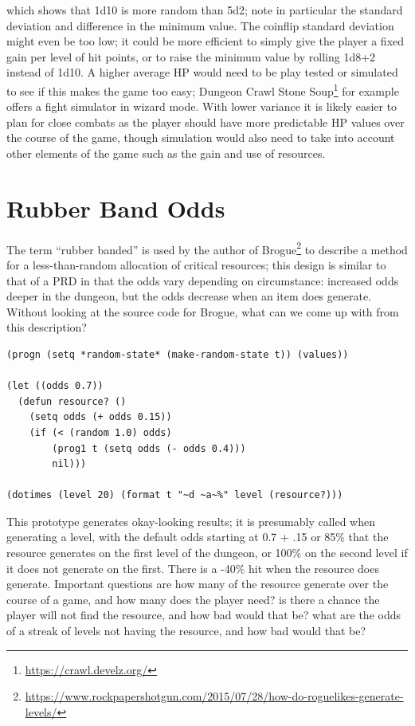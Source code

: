 \documentclass[12pt,a4paper]{article}
\begin{document}
which shows that 1d10 is more random than 5d2; note in particular the
standard deviation and difference in the minimum value. The coinflip
standard deviation might even be too low; it could be more efficient to
simply give the player a fixed gain per level of hit points, or to raise
the minimum value by rolling 1d8+2 instead of 1d10. A higher average HP
would need to be play tested or simulated to see if this makes the game
too easy; Dungeon Crawl Stone
Soup\footnote{\url{https://crawl.develz.org/}} for example offers a
fight simulator in wizard mode. With lower variance it is likely easier
to plan for close combats as the player should have more predictable HP
values over the course of the game, though simulation would also need to
take into account other elements of the game such as the gain and use of
resources.

\section*{Rubber Band Odds}

The term ``rubber banded'' is used by the author of
Brogue\footnote{\url{https://www.rockpapershotgun.com/2015/07/28/how-do-roguelikes-generate-levels/}}
to describe a method for a less-than-random allocation of critical
resources; this design is similar to that of a PRD in that the odds vary
depending on circumstance: increased odds deeper in the dungeon, but the
odds decrease when an item does generate. Without looking at the source
code for Brogue, what can we come up with from this description?

\begin{verbatim}
(progn (setq *random-state* (make-random-state t)) (values))

(let ((odds 0.7))
  (defun resource? ()
    (setq odds (+ odds 0.15))
    (if (< (random 1.0) odds)
        (prog1 t (setq odds (- odds 0.4)))
        nil)))

(dotimes (level 20) (format t "~d ~a~%" level (resource?)))
\end{verbatim}

This prototype generates okay-looking results; it is presumably called
when generating a level, with the default odds starting at 0.7 + .15 or
85\% that the resource generates on the first level of the dungeon, or
100\% on the second level if it does not generate on the first. There is
a -40\% hit when the resource does generate. Important questions are how
many of the resource generate over the course of a game, and how many
does the player need? is there a chance the player will not find the
resource, and how bad would that be? what are the odds of a streak of
levels not having the resource, and how bad would that be? \\
\end{document}
